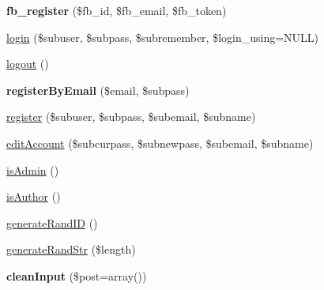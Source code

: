 \begin{DoxyCompactItemize}
\item 
\hypertarget{class_session_a3d8f4ab7eef2297cd5b302597614c6fc}{{\bfseries fb\-\_\-register} (\$fb\-\_\-id, \$fb\-\_\-email, \$fb\-\_\-token)}\label{class_session_a3d8f4ab7eef2297cd5b302597614c6fc}

\item 
\hyperlink{class_session_a58013a1c19bca336eeaae59d6a8ad638}{login} (\$subuser, \$subpass, \$subremember, \$login\-\_\-using=N\-U\-L\-L)
\item 
\hyperlink{class_session_a082405d89acd6835c3a7c7a08a7adbab}{logout} ()
\item 
\hypertarget{class_session_a344dcdf5aaee1d6c78d9c95e801a9b3c}{{\bfseries register\-By\-Email} (\$email, \$subpass)}\label{class_session_a344dcdf5aaee1d6c78d9c95e801a9b3c}

\item 
\hyperlink{class_session_aec75219db39c91e4e6251dc0cf1e2cf7}{register} (\$subuser, \$subpass, \$subemail, \$subname)
\item 
\hyperlink{class_session_afb5e20f05a37240b201930237e5bfefa}{edit\-Account} (\$subcurpass, \$subnewpass, \$subemail, \$subname)
\item 
\hyperlink{class_session_aabf23b66cd362adaa508de5bfb22706a}{is\-Admin} ()
\item 
\hyperlink{class_session_a3a5078a92dbfd524000e464d8a16d354}{is\-Author} ()
\item 
\hyperlink{class_session_aae3ab5a5ee46ab2c8f8e6862abdbcd12}{generate\-Rand\-I\-D} ()
\item 
\hyperlink{class_session_a2176267602e1ac909d3e72c7197792e1}{generate\-Rand\-Str} (\$length)
\item 
\hypertarget{class_session_adf2b9065e86388d300b4c3f213aafa99}{{\bfseries clean\-Input} (\$post=array())}\label{class_session_adf2b9065e86388d300b4c3f213aafa99}

\end{DoxyCompactItemize}
